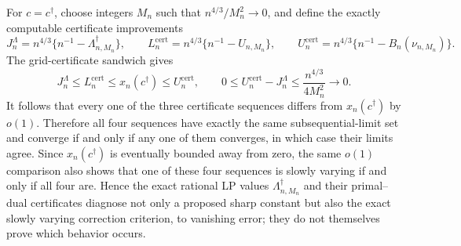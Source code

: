 For \(c=c^\dagger\), choose integers \(M_n\) such that \(n^{4/3}/M_n^2\to0\), and define the exactly computable certificate improvements
\[
 J_n^{\Lambda}=n^{4/3}\{n^{-1}-\Lambda_{n,M_n}^\dagger\},
 \qquad
 L_n^{\mathrm{cert}}=n^{4/3}\{n^{-1}-U_{n,M_n}\},
 \qquad
 U_n^{\mathrm{cert}}=n^{4/3}
 \{n^{-1}-B_n(\nu_{n,M_n})\}.
\]
The grid-certificate sandwich gives
\[
 J_n^{\Lambda}\leq L_n^{\mathrm{cert}}
 \leq x_n(c^\dagger)\leq U_n^{\mathrm{cert}},
 \qquad
 0\leq U_n^{\mathrm{cert}}-J_n^{\Lambda}
 \leq\frac{n^{4/3}}{4M_n^2}\longrightarrow0.
\]
It follows that every one of the three certificate sequences differs from \(x_n(c^\dagger)\) by \(o(1)\).  Therefore all four sequences have exactly the same subsequential-limit set and converge if and only if any one of them converges, in which case their limits agree.  Since \(x_n(c^\dagger)\) is eventually bounded away from zero, the same \(o(1)\) comparison also shows that one of these four sequences is slowly varying if and only if all four are.  Hence the exact rational LP values \(\Lambda_{n,M_n}^\dagger\) and their primal--dual certificates diagnose not only a proposed sharp constant but also the exact slowly varying correction criterion, to vanishing error; they do not themselves prove which behavior occurs.